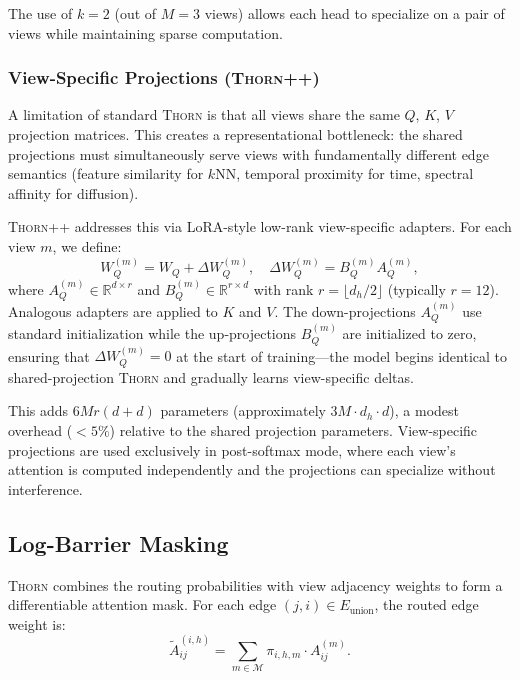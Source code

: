 \documentclass[11pt,a4paper]{article}
\newcommand{\thorn}{\textsc{Thorn}}
\newcommand{\thornpp}{\textsc{Thorn++}}
\newcommand{\RR}{\mathbb{R}}
\newcommand{\calM}{\mathcal{M}}
\begin{document}
The use of $k = 2$ (out of $M = 3$ views) allows each head to
specialize on a pair of views while maintaining sparse computation.

\subsubsection{View-Specific Projections (\thornpp{})}
\label{sec:view_projections}

A limitation of standard \thorn{} is that all views share the same
$Q$, $K$, $V$ projection matrices.
This creates a representational bottleneck: the shared projections must
simultaneously serve views with fundamentally different edge semantics
(feature similarity for $k$NN, temporal proximity for time, spectral
affinity for diffusion).

\thornpp{} addresses this via LoRA-style \citep{hu2020lora} low-rank
view-specific adapters.
For each view $m$, we define:
\begin{equation}
  \label{eq:lora_qkv}
  W_Q^{(m)} = W_Q + \Delta W_Q^{(m)}, \quad
  \Delta W_Q^{(m)} = B_Q^{(m)} A_Q^{(m)},
\end{equation}
where $A_Q^{(m)} \in \RR^{d \times r}$ and $B_Q^{(m)} \in \RR^{r \times d}$
with rank $r = \lfloor d_h / 2 \rfloor$ (typically $r = 12$).
Analogous adapters are applied to $K$ and $V$.
The down-projections $A_Q^{(m)}$ use standard initialization while the
up-projections $B_Q^{(m)}$ are initialized to zero, ensuring that
$\Delta W_Q^{(m)} = 0$ at the start of training---the model begins
identical to shared-projection \thorn{} and gradually learns
view-specific deltas.

This adds $6Mr(d + d)$ parameters (approximately $3M \cdot d_h \cdot d$),
a modest overhead ($< 5\%$) relative to the shared projection parameters.
View-specific projections are used exclusively in post-softmax mode,
where each view's attention is computed independently and the projections
can specialize without interference.

\subsection{Log-Barrier Masking}
\label{sec:logbarrier}

\thorn{} combines the routing probabilities with view adjacency weights
to form a differentiable attention mask.
For each edge $(j, i) \in E_{\mathrm{union}}$, the routed edge weight
is:
\begin{equation}
  \label{eq:routedA}
  \tilde{A}_{ij}^{(i,h)} = \sum_{m \in \calM}
    \pi_{i,h,m} \cdot A_{ij}^{(m)}.
\end{equation}
\end{document}
